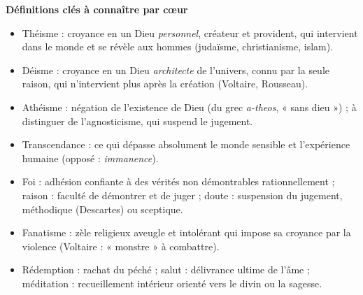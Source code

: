 \documentclass[11pt]{article}
\newcommand{\cle}[1]{{\popxbold\color{popdark}#1}}
\begin{document}
\begin{bilan}
\textbf{Définitions clés à connaître par cœur}
\begin{itemize}
  \item \cle{Théisme} : croyance en un Dieu \emph{personnel}, créateur et provident, qui intervient dans le monde et se révèle aux hommes (judaïsme, christianisme, islam).
  \item \cle{Déisme} : croyance en un Dieu \emph{architecte} de l'univers, connu par la seule raison, qui n'intervient plus après la création (Voltaire, Rousseau).
  \item \cle{Athéisme} : négation de l'existence de Dieu (du grec \emph{a-theos}, « sans dieu ») ; à distinguer de l'\cle{agnosticisme}, qui suspend le jugement.
  \item \cle{Transcendance} : ce qui dépasse absolument le monde sensible et l'expérience humaine (opposé : \emph{immanence}).
  \item \cle{Foi} : adhésion confiante à des vérités non démontrables rationnellement ; \cle{raison} : faculté de démontrer et de juger ; \cle{doute} : suspension du jugement, méthodique (Descartes) ou sceptique.
  \item \cle{Fanatisme} : zèle religieux aveugle et intolérant qui impose sa croyance par la violence (Voltaire : « monstre » à combattre).
  \item \cle{Rédemption} : rachat du péché ; \cle{salut} : délivrance ultime de l'âme ; \cle{méditation} : recueillement intérieur orienté vers le divin ou la sagesse.
\end{itemize}


\end{bilan}
\end{document}
